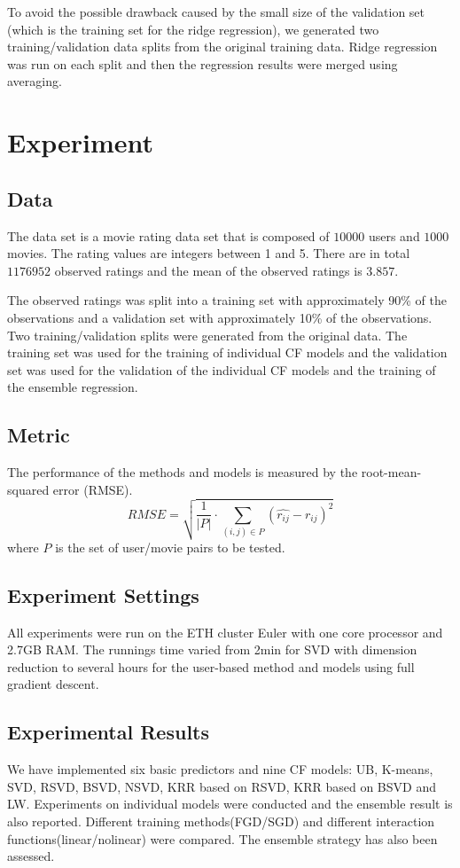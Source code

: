 \documentclass[10pt,conference,compsocconf]{IEEEtran}
\begin{document}
To avoid the possible drawback caused by the small size of the validation set (which is the training set for the ridge regression), we generated two training/validation data splits from the original training data. Ridge regression was run on each split and then the regression results were merged using averaging.

\section{Experiment}
\subsection{Data}
 The data set is a movie rating data set that is composed of $10000$ users and $1000$ movies. The rating values are integers between 1 and 5. There are in total $1176952$ observed ratings and the mean of the observed ratings is $3.857$.

 The observed ratings was split into a training set with approximately 90\% of the observations and a validation set with approximately 10\% of the observations. Two training/validation splits were generated from the original data. The training set was used for the training of individual CF models and the validation set was used for the validation of the individual CF models and the training of the ensemble regression.

\subsection{Metric}
The performance of the methods and models is measured by the root-mean-squared error (RMSE).
\[RMSE = \sqrt {\frac{1}{{\left| P \right|}} \cdot \sum\limits_{(i,j) \in P} {{{({\hat{r_{ij}}} - {r_{ij}})}^2}} } \]
where $P$ is the set of user/movie pairs to be tested.

\subsection{Experiment Settings}
All experiments were run on the ETH cluster Euler with one core processor and 2.7GB RAM. The runnings time varied from 2min for SVD with dimension reduction to several hours for the user-based method and models using full gradient descent.

\subsection{Experimental Results}
We have implemented six basic predictors and nine CF models: UB, K-means, SVD, RSVD, BSVD, NSVD, KRR based on RSVD, KRR based on BSVD and LW. Experiments on individual models were conducted and the ensemble result is also reported. Different training methods(FGD/SGD) and different interaction
functions(linear/nolinear) were compared. The ensemble strategy has also been assessed.
\end{document}
